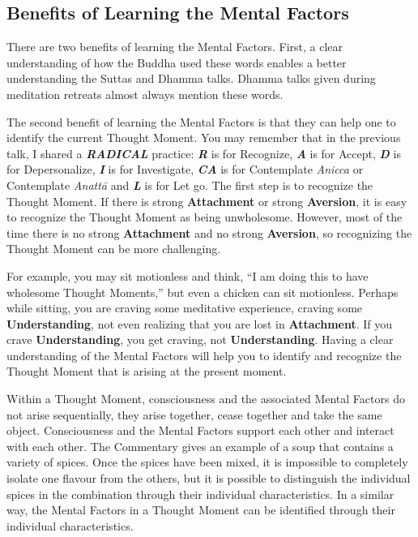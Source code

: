 \subsection*{Benefits of Learning the Mental Factors}

There are two benefits of learning the Mental Factors. First, a clear understanding of how the Buddha used these words enables a better understanding the Suttas and Dhamma talks. Dhamma talks given during meditation retreats almost always mention these words.

The second benefit of learning the Mental Factors is that they can help one to identify the current Thought Moment. You may remember that in the previous talk, I shared a \textbf{\textit{RADICAL}} practice: \textbf{\textit{R}} is for Recognize, \textbf{\textit{A}} is for Accept, \textbf{\textit{D}} is for Depersonalize, \textbf{\textit{I}} is for Investigate, \textbf{\textit{CA}} is for Contemplate \textit{Anicca} or Contemplate \textit{Anattā} and \textit{\textbf{L}} is for Let go. The first step is to recognize the Thought Moment. If there is strong \textbf{Attachment} or strong \textbf{Aversion}, it is easy to recognize the Thought Moment as being unwholesome. However, most of the time there is no strong \textbf{Attachment} and no strong \textbf{Aversion}, so recognizing the Thought Moment can be more challenging.

For example, you may sit motionless and think, “I am doing this to have wholesome Thought Moments,” but even a chicken can sit motionless. Perhaps while sitting, you are craving some meditative experience, craving some \textbf{Understanding}, not even realizing that you are lost in \textbf{Attachment}. If you crave \textbf{Understanding}, you get craving, not \textbf{Understanding}. Having a clear understanding of the Mental Factors will help you to identify and recognize the Thought Moment that is arising at the present moment.

Within a Thought Moment, consciousness and the associated Mental Factors do not arise sequentially, they arise together, cease together and take the same object. Consciousness and the Mental Factors support each other and interact with each other. The Commentary gives an example of a soup that contains a variety of spices. Once the spices have been mixed, it is impossible to completely isolate one flavour from the others, but it is possible to distinguish the individual spices in the combination through their individual characteristics. In a similar way, the Mental Factors in a Thought Moment can be identified through their individual characteristics.

